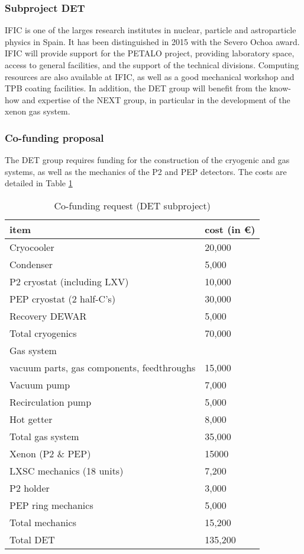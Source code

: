 \subsubsection*{Subproject DET}

IFIC is one of the larges research institutes in nuclear, particle and astroparticle physics in Spain. It has been distinguished in 2015 with the Severo Ochoa award. IFIC will provide support for the PETALO project, providing laboratory space, access to general facilities, and the support of the technical divisions. Computing resources are also available at IFIC, as well as a good mechanical workshop and TPB coating facilities. In addition, the DET group will benefit from the know-how and expertise of the NEXT group, in particular in the development of the xenon gas system.  

\subsubsection*{Co-funding proposal}
The DET group requires funding for the construction of the cryogenic and gas systems, as well as the mechanics of the P2 and PEP detectors. The costs are detailed in Table \ref{tab.costs.det}

\begin{table}[htp!]
\caption{Co-funding request (DET subproject)}
\begin{center}
\begin{tabular}{|l|l|}
\hline
item & cost (in \euro) \\
\hline
Cryocooler &	20,000 \\
Condenser &	5,000 \\
P2 cryostat (including LXV)  & 10,000 \\
PEP cryostat  (2 half-C's) & 30,000 \\
Recovery DEWAR &	5,000 \\
\hline
Total cryogenics &	70,000 \\
\hline
Gas system & \\
\hline	
vacuum parts, gas components, feedthroughs &	15,000 \\
Vacuum pump &  	7,000 \\
Recirculation pump & 5,000 \\
Hot getter & 8,000 \\
\hline
Total gas system &	35,000 \\
\hline
Xenon (P2 \& PEP) & 15000 \\
\hline
LXSC mechanics (18 units) & 7,200 \\
P2 holder & 3,000 \\
PEP ring mechanics & 5,000 \\
\hline
Total mechanics &	15,200 \\
\hline
Total DET &	135,200 \\
\hline
\end{tabular}
\end{center}
\label{tab.costs.det}
\end{table}%
